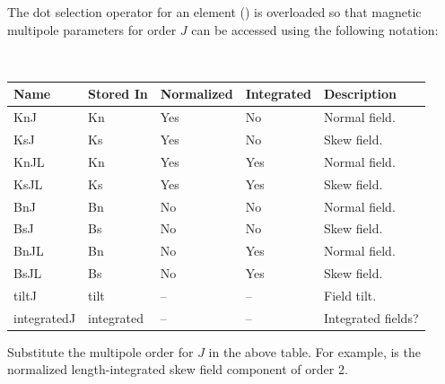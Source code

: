 The dot selection operator for an element () is overloaded so that 
magnetic multipole parameters for order $J$ can be accessed using the following notation:
\hfill\break
{\tt
\begin{tabular}{lllll} \toprule
  Name        & Stored In  & Normalized & Integrated & Description \\ \midrule
  KnJ         & Kn         & Yes        & No         & Normal field. \\
  KsJ         & Ks         & Yes        & No         & Skew field. \\
  KnJL        & Kn         & Yes        & Yes        & Normal field. \\
  KsJL        & Ks         & Yes        & Yes        & Skew field. \\
  BnJ         & Bn         & No         & No         & Normal field. \\
  BsJ         & Bs         & No         & No         & Skew field. \\
  BnJL        & Bn         & No         & Yes        & Normal field. \\
  BsJL        & Bs         & No         & Yes        & Skew field. \\
  tiltJ       & tilt       & --         & --         & Field tilt. \\
  integratedJ & integrated & --         & --         & Integrated fields? \\
\bottomrule
\end{tabular}
}
\hfill\break
Substitute the multipole order for $J$ in the above table. For example,  is the
normalized length-integrated skew field component of order 2. 

